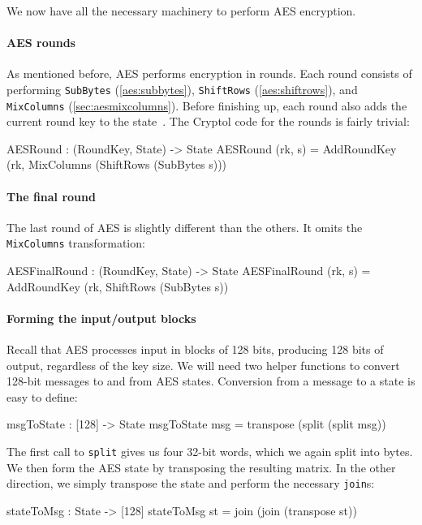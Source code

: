 
We now have all the necessary machinery to perform AES\indAES
encryption.

\paragraph*{AES rounds} As mentioned before, AES performs encryption in
rounds. Each round consists of performing {\tt SubBytes}
(\autoref{aes:subbytes}), {\tt ShiftRows}
(\autoref{aes:shiftrows}), and {\tt MixColumns}
(\autoref{sec:aesmixcolumns}). Before finishing up, each round
also adds the current round key to the state~\cite[section
5.1]{aes}. The Cryptol code for the rounds is fairly trivial:
\begin{code}
  AESRound : (RoundKey, State) -> State
  AESRound (rk, s) = AddRoundKey (rk,
                                  MixColumns (ShiftRows (SubBytes s)))
\end{code}

\paragraph*{The final round} The last round of AES is slightly
different than the others. It omits the {\tt MixColumns}
transformation:
\begin{code}
  AESFinalRound : (RoundKey, State) -> State
  AESFinalRound (rk, s) = AddRoundKey (rk, ShiftRows (SubBytes s))
\end{code}

\paragraph*{Forming the input/output blocks} Recall that AES processes
input in blocks of 128 bits, producing 128 bits of output, regardless
of the key size.  We will need two helper functions to convert 128-bit
messages to and from AES states.  Conversion from a message to a state
is easy to define:
\begin{code}
  msgToState : [128] -> State
  msgToState msg = transpose (split (split msg))
\end{code}
The first call to \texttt{split} gives us four 32-bit words, which we again
split into bytes.  We then form the AES state by transposing the
resulting matrix.  In the other direction, we simply transpose the
state and perform the necessary
\texttt{join}s:\indTranspose\indJoin\indReverse\indSplit
\begin{code}
  stateToMsg : State -> [128]
  stateToMsg st = join (join (transpose st))
\end{code}

